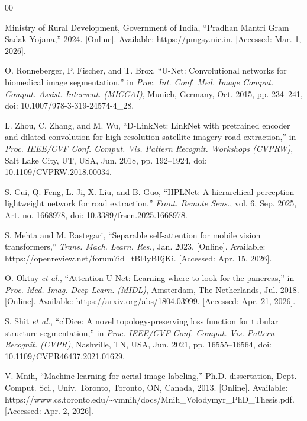\documentclass{ieeeaccess}
\begin{document}
\begin{thebibliography}{00}

Ministry of Rural Development, Government of India, ``Pradhan Mantri Gram Sadak Yojana,'' 2024. [Online]. Available: https://pmgsy.nic.in. [Accessed: Mar. 1, 2026].

O. Ronneberger, P. Fischer, and T. Brox, ``U-Net: Convolutional networks for biomedical image segmentation,'' in \emph{Proc. Int. Conf. Med. Image Comput. Comput.-Assist. Intervent. (MICCAI)}, Munich, Germany, Oct. 2015, pp. 234--241, doi: 10.1007/978-3-319-24574-4\_28.

L. Zhou, C. Zhang, and M. Wu, ``D-LinkNet: LinkNet with pretrained encoder and dilated convolution for high resolution satellite imagery road extraction,'' in \emph{Proc. IEEE/CVF Conf. Comput. Vis. Pattern Recognit. Workshops (CVPRW)}, Salt Lake City, UT, USA, Jun. 2018, pp. 192--1924, doi: 10.1109/CVPRW.2018.00034.

S. Cui, Q. Feng, L. Ji, X. Liu, and B. Guo, ``HPLNet: A hierarchical perception lightweight network for road extraction,'' \emph{Front. Remote Sens.}, vol. 6, Sep. 2025, Art. no. 1668978, doi: 10.3389/frsen.2025.1668978.

S. Mehta and M. Rastegari, ``Separable self-attention for mobile vision transformers,'' \emph{Trans. Mach. Learn. Res.}, Jan. 2023. [Online]. Available: https://openreview.net/forum?id=tBl4yBEjKi. [Accessed: Apr. 15, 2026].

O. Oktay \emph{et al.}, ``Attention U-Net: Learning where to look for the pancreas,'' in \emph{Proc. Med. Imag. Deep Learn. (MIDL)}, Amsterdam, The Netherlands, Jul. 2018. [Online]. Available: https://arxiv.org/abs/1804.03999. [Accessed: Apr. 21, 2026].

S. Shit \emph{et al.}, ``clDice: A novel topology-preserving loss function for tubular structure segmentation,'' in \emph{Proc. IEEE/CVF Conf. Comput. Vis. Pattern Recognit. (CVPR)}, Nashville, TN, USA, Jun. 2021, pp. 16555--16564, doi: 10.1109/CVPR46437.2021.01629.

V. Mnih, ``Machine learning for aerial image labeling,'' Ph.D. dissertation, Dept. Comput. Sci., Univ. Toronto, Toronto, ON, Canada, 2013. [Online]. Available: https://www.cs.toronto.edu/\~{}vmnih/docs/Mnih\_Volodymyr\_PhD\_Thesis.pdf. [Accessed: Apr. 2, 2026].


\end{thebibliography}
\end{document}

